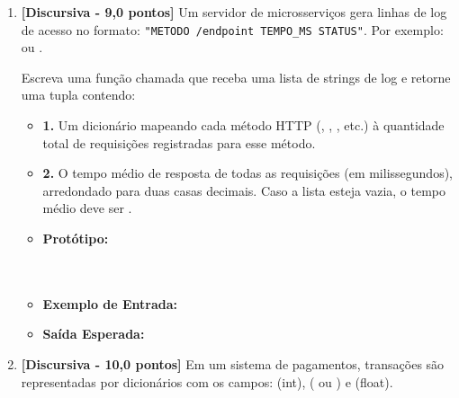 \begin{enumerate}[label=\textbf{Q\arabic*.}, start=1]


\vspace{0.5cm}

\item \textbf{[Discursiva - 9,0 pontos]} Um servidor de microsserviços gera linhas de log de acesso no formato: \texttt{"METODO /endpoint TEMPO\_MS STATUS"}. Por exemplo:  ou .

Escreva uma função chamada  que receba uma lista de strings de log e retorne uma tupla contendo:
\begin{itemize}[leftmargin=*]
    \item \textbf{1.} Um dicionário mapeando cada método HTTP (, , , etc.) à quantidade total de requisições registradas para esse método.
    \item \textbf{2.} O tempo médio de resposta de todas as requisições (em milissegundos), arredondado para duas casas decimais. Caso a lista esteja vazia, o tempo médio deve ser .
\end{itemize}

\begin{itemize}[leftmargin=*]
    \item \textbf{Protótipo:}\newline {}\\\\\\
    \item \textbf{Exemplo de Entrada:} 
    \item \textbf{Saída Esperada:} 
\end{itemize}



\vspace{0.5cm}

\item \textbf{[Discursiva - 10,0 pontos]} Em um sistema de pagamentos, transações são representadas por dicionários com os campos:  (int),  ( ou ) e  (float).


\end{enumerate}
